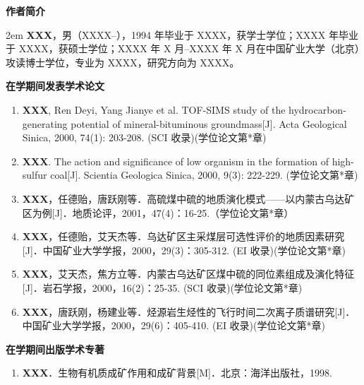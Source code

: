 \clearpage
{}
{}
\begingroup
    \centering
    \heiti\bfseries 作者简介
    \par
    \vspace{\baselineskip}
\endgroup

\begingroup
    \songti
    \setlength{\baselineskip}{\bodylineskip}
    \parindent 2em
    \textbf{XXX}，男（XXXX--），1994 年毕业于 XXXX，获学士学位；XXXX 年毕业于 XXXX，获硕士学位；XXXX 年 X 月--XXXX 年 X 月在中国矿业大学（北京）攻读博士学位，专业为 XXXX，研究方向为 XXXX。
\endgroup

\vspace{2\baselineskip}
\begingroup
    \centering
    \heiti\bfseries 在学期间发表学术论文
    \par
    \vspace{\baselineskip}
\endgroup

\begin{enumerate}[label=\arabic*., leftmargin=2em, itemsep=0pt, parsep=0pt]
    \songti
    \item \textbf{XXX}, Ren Deyi, Yang Jianye et al. TOF-SIMS study of the hydrocarbon-generating potential of mineral-bituminous groundmass[J]. Acta Geological Sinica, 2000, 74(1): 203-208. (SCI 收录)(学位论文第*章)
    \item \textbf{XXX}. The action and significance of low organism in the formation of high-sulfur coal[J]. Scientia Geologica Sinica, 2000, 9(3): 222-229. (学位论文第*章)
    \item \textbf{XXX}，任德贻，唐跃刚等．高硫煤中硫的地质演化模式——以内蒙古乌达矿区为例[J]．地质论评，2001，47(4)：16-25.（学位论文第*章）
    \item \textbf{XXX}，任德贻，艾天杰等．乌达矿区主采煤层可选性评价的地质因素研究[J]．中国矿业大学学报，2000，29(3)：305-312. (EI 收录)(学位论文第*章)
    \item \textbf{XXX}，艾天杰，焦方立等．内蒙古乌达矿区煤中硫的同位素组成及演化特征[J]．岩石学报，2000，16(2)：25-35. (SCI 收录)(学位论文第*章)
    \item \textbf{XXX}，唐跃刚，杨建业等．烃源岩生烃性的飞行时间二次离子质谱研究[J]．中国矿业大学学报，2000，29(6)：405-410. (EI 收录)(学位论文第*章)
\end{enumerate}

\vspace{1\baselineskip}
\begingroup
    \centering
    \heiti\bfseries 在学期间出版学术专著
    \par
    \vspace{\baselineskip}
\endgroup
\begin{enumerate}[label=\arabic*., leftmargin=2em, itemsep=0pt, parsep=0pt]
    \songti
    \item \textbf{XXX}．生物有机质成矿作用和成矿背景[M]．北京：海洋出版社，1998.
\end{enumerate}


